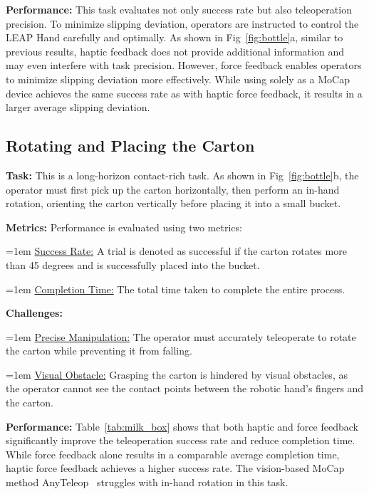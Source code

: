 \noindent \textbf{Performance:}
This task evaluates not only success rate but also teleoperation precision. To minimize slipping deviation, operators are instructed to control the LEAP Hand carefully and optimally. As shown in Fig~\ref{fig:bottle}a, similar to previous results, haptic feedback does not provide additional information and may even interfere with task precision. However, force feedback enables operators to minimize slipping deviation more effectively. While using \oursystem solely as a MoCap device achieves the same success rate as with haptic force feedback, it results in a larger average slipping deviation.


\subsection{Rotating and Placing the Carton}
\label{sec::milk_box}




\noindent \textbf{Task:} 
This is a long-horizon contact-rich task. As shown in Fig~\ref{fig:bottle}b, the operator must first pick up the carton horizontally, then perform an in-hand rotation, orienting the carton vertically before placing it into a small bucket.

\noindent \textbf{Metrics:} 
Performance is evaluated using two metrics:

\hangindent=1em
\noindent\textbullet\hspace{0.5em}\ul{Success Rate:} A trial is denoted as successful if the carton rotates more than 45 degrees and is successfully placed into the bucket.

\hangindent=1em
\noindent\textbullet\hspace{0.5em}\ul{Completion Time:} The total time taken to complete the entire process.

\noindent \textbf{Challenges:} 

\hangindent=1em
\noindent\textbullet\hspace{0.5em}\ul{Precise Manipulation:} The operator must accurately teleoperate to rotate the carton while preventing it from falling.

\hangindent=1em
\noindent\textbullet\hspace{0.5em}\ul{Visual Obstacle:} Grasping the carton is hindered by visual obstacles, as the operator cannot see the contact points between the robotic hand’s fingers and the carton.

\noindent \textbf{Performance:}
Table~\ref{tab:milk_box} shows that both haptic and force feedback significantly improve the teleoperation success rate and reduce completion time. While force feedback alone results in a comparable average completion time, haptic force feedback achieves a higher success rate. The vision-based MoCap method AnyTeleop~\cite{qin2023anyteleop} struggles with in-hand rotation in this task.


